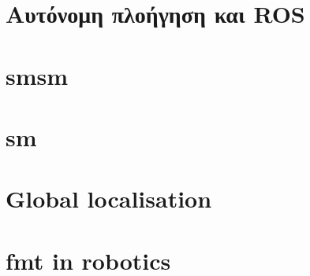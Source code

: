 \section{Αυτόνομη πλοήγηση και ROS}
  

\section{smsm}
  

\section{sm}
  

\section{Global localisation}
  

\section{fmt in robotics}
  

